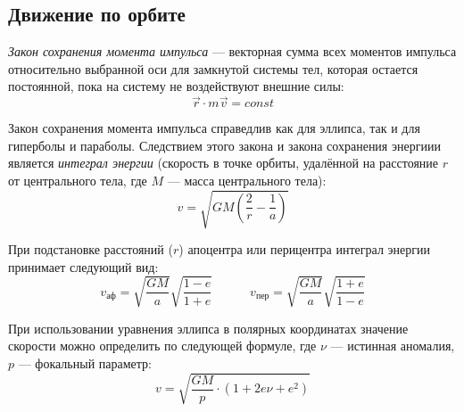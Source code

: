\subsection{Движение по орбите}

\textit{Закон сохранения момента импульса} ---  векторная сумма всех моментов 
импульса относительно выбранной оси для замкнутой системы тел, которая остается 
постоянной, пока на систему не воздействуют внешние силы:
\begin{equation}
\vec{r} \cdot m\vec{v}=const  
\end{equation}

Закон сохранения момента импульса справедлив как для эллипса, так и для 
гиперболы и параболы. Следствием этого закона и закона сохранения энергиии 
является        \textit{ интеграл энергии} (скорость в точке орбиты, удалённой 
на расстояние $r$ от центрального тела, где $M$ --- масса центрального тела):
\begin{equation}v=\sqrt{GM\left(\frac2r - \frac1a\right)}
\end{equation}

При подстановке расстояний ($r$) апоцентра или перицентра интеграл энергии 
принимает следующий вид:
\begin{equation}v_{\text{аф}}=\sqrt{\frac{GM}{a}} \sqrt{\frac{1-e}{1+e}}
\quad\quad\quad v_{\text{пер}}=\sqrt{\frac{GM}{a}}\sqrt{\frac{1+e}{1-e}}
\end{equation}

При использовании уравнения эллипса в полярных координатах значение скорости 
можно определить по следующей формуле, где $\nu$ --- истинная аномалия, $p$ --- 
фокальный параметр:
\begin{equation}v=\sqrt{\frac{GM}{p}\cdot(1+2e\nu+e^2)}
\end{equation}
